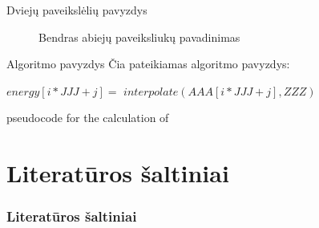 \documentclass[12pt]{beamer}
\begin{document}
\begin{frame}[allowframebreaks]{Dviejų paveikslėlių pavyzdys}
    \begin{figure}
    \caption{Bendras abiejų paveiksliukų pavadinimas}
    \label{fig:du-paveiksleliai}
\end{figure}
\end{frame}

\begin{frame}{Algoritmo pavyzdys}
    Čia pateikiamas algoritmo pavyzdys:
    \begin{algorithm}[H]
    \begin{algorithmic}[1]
    \STATE $energy[i*JJJ+j] =$ 
    $ interpolate(AAA[i*JJJ+j], ZZZ)$
    \ENDFOR
    \ENDFOR
    \end{algorithmic}
    \caption{pseudocode for the calculation of}
    \label{alg:seq}
    \end{algorithm}
\end{frame}

\section{Literatūros šaltiniai}
\begin{frame}[t,allowframebreaks]
    \frametitle{Literatūros šaltiniai}
    \printbibliography
\end{frame}
\end{document}
